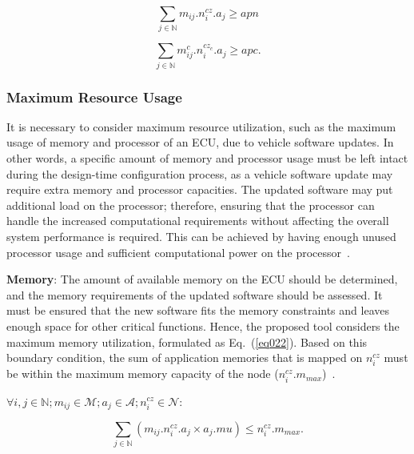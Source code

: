     
    \begin{equation}
    	\sum_{j \in \mathbb{N}} {m_{ij}}.{n_i^{cz}}.a_j \geq apn
    	\label{eqr22}
    \end{equation}

    \begin{equation}
    	\sum_{j \in \mathbb{N}} {m^{c}_{ij}}.{n_i^{cz_c}}.a_j \geq apc.
    	\label{eqr022}
    \end{equation}
    
    \subsubsection{Maximum Resource Usage}
    It is necessary to consider maximum resource utilization, such as the maximum usage of memory and processor of an ECU, due to vehicle software updates. In other words, a specific amount of memory and processor usage must be left intact during the design-time configuration process, as a vehicle software update may require extra memory and processor capacities.
     The updated software may put additional load on the processor; therefore, ensuring that the processor can handle the increased computational requirements without affecting the overall system performance is required. This can be achieved by having enough unused processor usage and sufficient computational power on the processor~\cite{askaripoor2022architecture, askaripoor2023designer}.\newline 
    
    
    \textbf{Memory}:
        The amount of available memory on the ECU should be determined, and the memory requirements of the updated software should be assessed. It must be ensured that the new software fits the memory constraints and leaves enough space for other critical functions. Hence, the proposed tool considers the maximum memory utilization, formulated as Eq.~(\ref{eq022}). Based on this boundary condition, the sum of application memories that is mapped on $n_i^{cz}$ must be within the maximum memory capacity of the node ($n_i^{cz}.m_{max}$)~\cite{askaripoor2023designer}.\newline
  

    $\forall i,j \in \mathbb{N}; m_{ij} \in\mathcal{M}; a_j \in\mathcal{A}; {n_{i}^{cz}} \in \mathcal{N}$: 
    
    \begin{equation}
    	\sum_{j \in \mathbb{N}} ({m_{ij}}.{n_i^{cz}}.a_j\times a_j.mu) \leq {n_i^{cz}}.m_{max}.
    	\label{eq022}
    \end{equation}\newline

